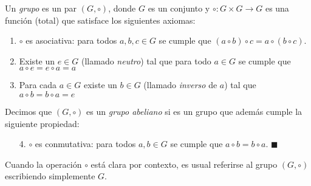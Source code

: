 

\begin{definition}
Un \emph{grupo} es un par $(G,\circ)$, donde $G$ es un conjunto y $\circ \colon G\times G\to G$ es una función (total) que satisface los siguientes axiomas:
\begin{enumerate}
	\item $\circ$ es asociativa: para todos $a,b,c \in G$ se cumple que $(a \circ b) \circ c = a \circ (b
\circ c)$.

	\item Existe un $e \in G$ (llamado \emph{neutro}) tal que para todo $a \in G$ se cumple que $a \circ e = e \circ a = a$

   \item Para cada $a \in G$ existe un $b \in G$ (llamado \emph{inverso} de $a$) tal que $a \circ b 	= b \circ a = e$
\end{enumerate}
Decimos que $(G,\circ)$ es un \emph{grupo abeliano} si es un grupo que además cumple la siguiente propiedad:
\begin{enumerate}
	\item[4.] $\circ$ es conmutativa: para todos $a,b\in G$ se cumple que $a\circ b = b\circ a$.  \hfill$\blacksquare$
\end{enumerate}
\end{definition}

Cuando la operación $\circ$ está clara por contexto, es usual referirse al grupo $(G, \circ)$ escribiendo simplemente $G$. 

